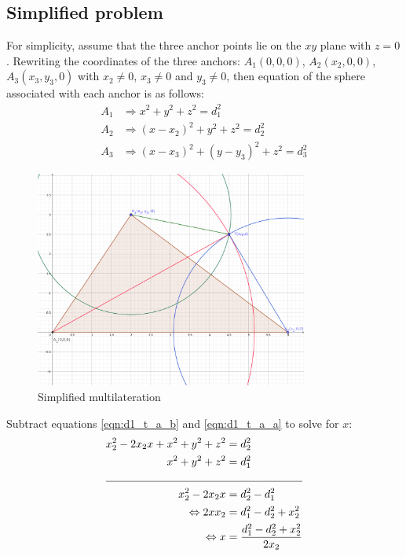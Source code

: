 \documentclass[\main/main.tex]{subfiles}
\begin{document}
\subsection{Simplified problem}
\label{subsection:multilateration_simplified_problem}
For simplicity, assume that the three anchor points lie on the $xy$ plane with $z = 0$. Rewriting the coordinates of the three anchors: $A_1(0,0,0)$, $A_2(x_2,0,0)$, $A_3(x_3,y_3,0)$ with $x_2 \neq 0$, $x_3 \neq 0$ and $y_3 \neq 0$, then equation of the sphere associated with each anchor is as follows:
\begin{subequations}
    \begin{align}
        A_1 &\Rightarrow  x^2 + y^2 + z^2 = d_1^2 \label{eqn:d1_t_a_a}\\
        A_2 &\Rightarrow (x-x_2)^2 + y^2 + z^2 = d_2^2 \label{eqn:d1_t_a_b}\\
        A_3 &\Rightarrow (x-x_3)^2 + (y-y_3)^2 + z^2 = d_3^2 \label{eqn:d1_t_a_c}
    \end{align}
\end{subequations}
\begin{figure}[H]
    \centering
    \includegraphics[width=0.8\textwidth]{simplified_multilateration.png}
    \caption{Simplified multilateration}
    \label{fig:simplified_multilateration}
\end{figure}
Subtract equations \ref{eqn:d1_t_a_b} and \ref{eqn:d1_t_a_a} to solve for $x$:
\begin{equation}
    \begin{split}
        x_2^2 - 2x_2x + x^2 + y^2 + z^2 &= d_2^2\\
        x^2 + y^2 + z^2 &= d_1^2 \\
        \cline{1-2}
        x_2^2 - 2x_2x &= d_2^2 - d_1^2 \\
        \Leftrightarrow 2xx_2 &=  d_1^2 - d_2^2 + x_2^2 \\
        \Leftrightarrow x &= \frac{d_1^2 - d_2^2 + x_2^2}{2x_2}
    \end{split}
    \label{eqn:simplified_multilateration_x}
\end{equation}
\end{document}
